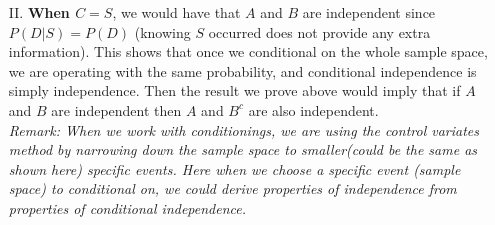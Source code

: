 \begin{exercise}
\begin{solution}
\begin{itemize}
			\item[II.] \textbf{When $C=S$}, we would have that $A$ and $B$ are independent since $P(D|S)=P(D)$ (knowing $S$ occurred does not provide any extra information). This shows that once we conditional on the whole sample space, we are operating with the same probability, and conditional independence is simply independence. Then the result we prove above would imply that if $A$ and $B$ are independent then $A$ and $B^c$ are also independent.\\ \textit{\scriptsize Remark: When we work with conditionings, we are using the control variates method by narrowing down the sample space to smaller(could be the same as shown here) specific events. Here when we choose a  specific event (sample space) to conditional on, we could derive properties of independence from properties of conditional independence.}  
		\end{itemize}
	\end{solution}	
\end{exercise}

